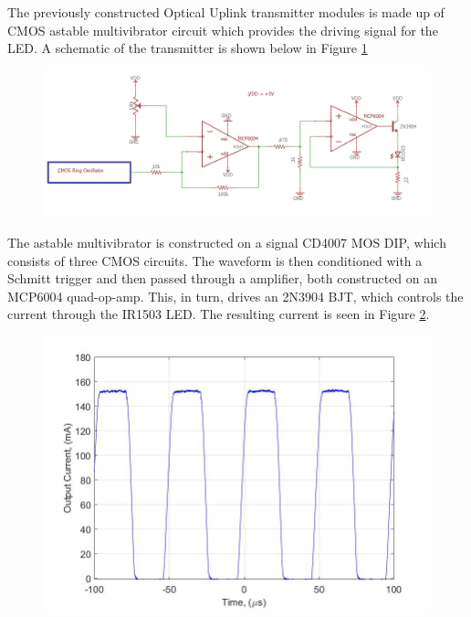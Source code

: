 

The previously constructed Optical Uplink transmitter modules is made up of CMOS astable multivibrator circuit which provides the driving signal for the LED. A schematic of the transmitter is shown below in Figure \ref{fig:finalexperimentalschem}

\begin{figure}[H]
	\centering
	\includegraphics[width=0.7\linewidth]{Preliminary_results/FINAlexperimentalSchem}
	\caption[Circuit schematic of transmitter]
	\label{fig:finalexperimentalschem}
\end{figure}

The astable multivibrator is constructed on a signal CD4007 MOS DIP, which consists of three CMOS circuits. The waveform is then conditioned with a Schmitt trigger and then passed through a amplifier, both constructed on an MCP6004 quad-op-amp. This, in turn, drives an 2N3904 BJT, which controls the current through the IR1503 LED. The resulting current is seen in Figure \ref{fig:expcurrentlab4}.

\begin{figure}[H]
	\centering
	\includegraphics[width=0.7\linewidth]{Preliminary_results/expcurrentlab4}
	\caption[Current through LED]
	\label{fig:expcurrentlab4}
\end{figure}


	
